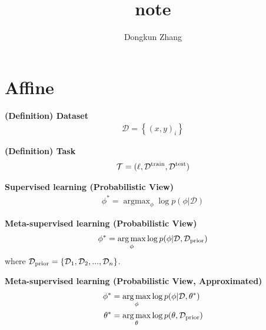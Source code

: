 
\usepackage[utf8]{inputenc}



\title{note}
\author{Dongkun Zhang}



\maketitle

\section{Affine}



\begin{tcolorbox}
\textbf{
    (Definition) Dataset
} 
\begin{align*}
    \mathcal{D} = \left\{ (x,y)_i \right\}
\end{align*}
\end{tcolorbox}


\begin{tcolorbox}
\textbf{
    (Definition) Task
} 
\begin{align*}
    \mathcal{T} = (\ell, \mathcal{D}^{{\rm train}}, \mathcal{D}^{{\rm test}})
\end{align*}
\end{tcolorbox}



\begin{tcolorbox}
\textbf{
    Supervised learning (Probabilistic View)
} 
\begin{align*}
    \phi^{*} = \mathop{\arg\max}_{\phi}\log p(\phi | \mathcal{D})
\end{align*}
\end{tcolorbox}


\begin{tcolorbox}
\textbf{
    Meta-supervised learning (Probabilistic View)
} 
\begin{align*}
    \phi^{*} = \mathop{\arg\max}_{\phi}\log p(\phi | \mathcal{D}, \mathcal{D}_{{\rm prior}})
\end{align*}
where $\mathcal{D}_{{\rm prior}} = \left\{ \mathcal{D}_1, \mathcal{D}_2, ..., \mathcal{D}_n \right\}$.
\end{tcolorbox}

\begin{tcolorbox}
\textbf{
    Meta-supervised learning (Probabilistic View, Approximated)
}
\begin{align*}
    \phi^{*} &= \mathop{\arg\max}_{\phi}\log p(\phi | \mathcal{D}, \theta^{*}) \\
    \theta^{*} &= \mathop{\arg\max}_{\theta}\log p(\theta, \mathcal{D}_{{\rm prior}})
\end{align*}
\end{tcolorbox}



